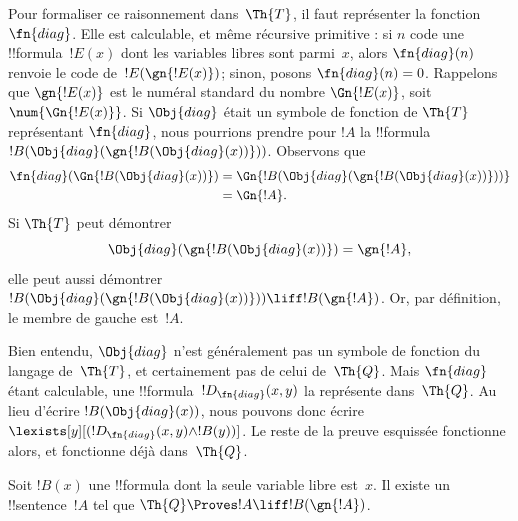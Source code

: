 \documentclass[../../../include/open-logic-section]{subfiles}
\begin{document}
\begin{explain}
Pour formaliser ce raisonnement dans~$\Th{T}$,
il faut représenter la fonction~$\fn{diag}$.
Elle est calculable, et même récursive primitive :
si $n$ code une !!{formula}~$!E(x)$ dont les variables libres
sont parmi~$x$, alors $\fn{diag}(n)$ renvoie
le code de~$!E(\gn{!E(x)})$; sinon, posons $\fn{diag}(n)=0$.
Rappelons que $\gn{!E(x)}$ est le numéral standard
du nombre $\Gn{!E(x)}$, soit $\num{\Gn{!E(x)}}$.
Si $\Obj{diag}$ était un symbole de fonction de
$\Th{T}$ représentant $\fn{diag}$, nous pourrions
prendre pour $!A$ la !!{formula}
$!B(\Obj{diag}(\gn{!B(\Obj{diag}(x))}))$.
Observons que
\begin{align*}
\fn{diag}(\Gn{!B(\Obj{diag}(x))}) & =
\Gn{!B(\Obj{diag}(\gn{!B(\Obj{diag}(x))}))} \\
& = \Gn{!A}.
\end{align*}
Si $\Th{T}$ peut démontrer
\[
\Obj{diag}(\gn{!B(\Obj{diag}(x))})=\gn{!A},
\]
elle peut aussi démontrer
$!B(\Obj{diag}(\gn{!B(\Obj{diag}(x))}))
\liff !B(\gn{!A})$. Or, par définition, le membre
de gauche est~$!A$.

Bien entendu, $\Obj{diag}$ n'est généralement pas
un symbole de fonction du langage de~$\Th{T}$,
et certainement pas de celui de~$\Th{Q}$.
Mais $\fn{diag}$ étant calculable, une
!!{formula}~$!D_{\fn{diag}}(x,y)$ la représente
dans~$\Th{Q}$. Au lieu d'écrire
$!B(\Obj{diag}(x))$, nous pouvons donc écrire
$\lexists[y][(!D_{\fn{diag}}(x,y)\land !B(y))]$.
Le reste de la preuve esquissée fonctionne alors,
et fonctionne déjà dans~$\Th{Q}$.
\end{explain}

\begin{lem}
Soit $!B(x)$ une !!{formula} dont la seule variable
libre est~$x$. Il existe un !!{sentence}~$!A$
tel que $\Th{Q}\Proves !A\liff !B(\gn{!A})$.
\end{lem}
\end{document}
